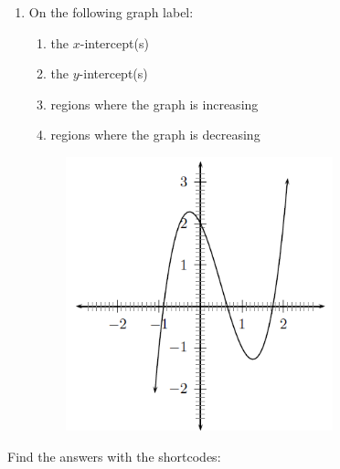 \begin{enumerate}[noitemsep, label=\textbf{\arabic*}. ]
\begin{figure}[H]
\begin{center}
      \vspace{2pt}
    \vspace{.1in}
    \end{center}
 \end{figure}               \label{m39337*uid63}\item On the following graph label:
\label{m39337*id237327}\begin{enumerate}[noitemsep, label=\textbf{\alph*}. ] 
            \label{m39337*uid64}\item the $x$-intercept(s)
\label{m39337*uid65}\item the $y$-intercept(s)
\label{m39337*uid66}\item regions where the graph is increasing
\label{m39337*uid67}\item regions where the graph is decreasing
\end{enumerate}
    \setcounter{subfigure}{0}
	\begin{figure}[H] %
    \begin{center}
    \label{m39337*id237401!!!underscore!!!media}\label{m39337*id237401!!!underscore!!!printimage}\includegraphics[height=300px]{col11306.imgs/m39337_MG10C11_004.png} %
      \vspace{2pt}
    \vspace{.1in}
    \end{center}
 \end{figure}               \end{enumerate}
\label{m39337**end}
\par {} Find the answers with the shortcodes:
